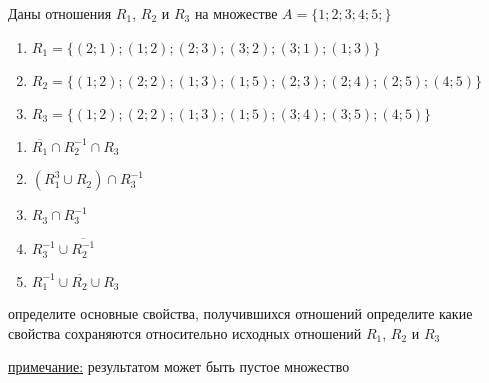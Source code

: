 \question
Даны отношения $R_1$, $R_2$ и $R_3$ на множестве $A = \{1; 2; 3; 4; 5;\}$ 
\begin{enumerate}
	\renewcommand{\labelenumi}{\alph{enumi})}
	\item $R_1 = \{(2; 1); (1; 2); (2; 3); (3; 2); (3; 1); (1; 3)\}$
	\item $R_2 = \{(1; 2); (2; 2); (1; 3); (1; 5); (2; 3); (2; 4); (2; 5); (4; 5)\}$
	\item $R_3 = \{(1; 2); (2; 2); (1; 3); (1; 5); (3; 4); (3; 5); (4; 5)\}$
\end{enumerate}

\begin{enumerate}
	\renewcommand{\labelenumi}{\alph{enumi})}
	\item $\overline{R_1} \cap R_2^{-1} \cap R_3$
	\item $(R_1^3 \cup R_2) \cap R_3^{-1}$
	\item $R_3 \cap R_3^{-1}$
	\item $R_3^{-1} \cup \overline{R_2^{-1}}$
	\item $R_1^{-1} \cup \overline{R_2} \cup R_3$
\end{enumerate}

определите основные свойства, получившихся отношений
определите какие свойства сохраняются относительно исходных отношений $R_1$, $R_2$ и $R_3$ 

\underline{примечание:} результатом может быть пустое множество